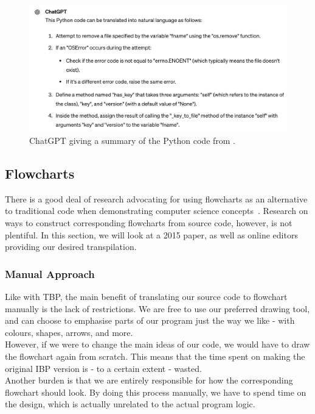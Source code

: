 \begin{figure}[ht]
    \centering
    \includegraphics[scale=.45]{assets/chapter3/gptOS.png}
    \caption{ChatGPT giving a summary of the Python code from .}
    \label{gptos}
\end{figure}

\subsection{Flowcharts}

There is a good deal of research advocating for using flowcharts as an alternative to traditional code when demonstrating computer science concepts~\cite{flowchartsAreGood1, flowchartsAreGood2, flowchartsAreGood3}. Research on ways to construct corresponding flowcharts from source code, however, is not plentiful. In this section, we will look at a 2015 paper, as well as online editors providing our desired transpilation. \\

\subsubsection{Manual Approach}

Like with TBP, the main benefit of translating our source code to flowchart manually is the lack of restrictions. We are free to use our preferred drawing tool, and can choose to emphasise parts of our program just the way we like - with colours, shapes, arrows, and more. \\

However, if we were to change the main ideas of our code, we would have to draw the flowchart again from scratch. This means that the time spent on making the original IBP version is - to a certain extent - wasted. \\

Another burden is that we are entirely responsible for how the corresponding flowchart should look. By doing this process manually, we have to spend time on the design, which is actually unrelated to the actual program logic.

